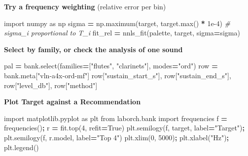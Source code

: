 \documentclass[
  10pt,
]{article}
\newenvironment{Shaded}{\begin{snugshade}}{\end{snugshade}}
\newcommand{\BuiltInTok}[1]{#1}
\newcommand{\CommentTok}[1]{\textcolor[rgb]{0.56,0.35,0.01}{\textit{#1}}}
\newcommand{\DecValTok}[1]{\textcolor[rgb]{0.00,0.00,0.81}{#1}}
\newcommand{\FloatTok}[1]{\textcolor[rgb]{0.00,0.00,0.81}{#1}}
\newcommand{\ImportTok}[1]{#1}
\newcommand{\NormalTok}[1]{#1}
\newcommand{\OperatorTok}[1]{\textcolor[rgb]{0.81,0.36,0.00}{\textbf{#1}}}
\newcommand{\StringTok}[1]{\textcolor[rgb]{0.31,0.60,0.02}{#1}}
\newcommand{\VariableTok}[1]{\textcolor[rgb]{0.00,0.00,0.00}{#1}}
\begin{document}
\textbf{Try a frequency weighting} (relative error per bin)

\begin{Shaded}
\begin{Highlighting}[]
\ImportTok{import}\NormalTok{ numpy }\ImportTok{as}\NormalTok{ np}
\NormalTok{sigma }\OperatorTok{=}\NormalTok{ np.maximum(target, target.}\BuiltInTok{max}\NormalTok{() }\OperatorTok{*} \FloatTok{1e{-}4}\NormalTok{)   }\CommentTok{\# sigma\_i proportional to T\_i}
\NormalTok{fit\_rel }\OperatorTok{=}\NormalTok{ nnls\_fit(palette, target, sigma}\OperatorTok{=}\NormalTok{sigma)}
\end{Highlighting}
\end{Shaded}

\textbf{Select by family, or check the analysis of one
sound}

\begin{Shaded}
\begin{Highlighting}[]
\NormalTok{pal }\OperatorTok{=}\NormalTok{ bank.select(families}\OperatorTok{=}\NormalTok{[}\StringTok{"flutes"}\NormalTok{, }\StringTok{"clarinets"}\NormalTok{], modes}\OperatorTok{=}\StringTok{"ord"}\NormalTok{)}
\NormalTok{row }\OperatorTok{=}\NormalTok{ bank.meta[}\StringTok{"vln{-}a4x{-}ord{-}mf"}\NormalTok{]}
\NormalTok{row[}\StringTok{"sustain\_start\_s"}\NormalTok{], row[}\StringTok{"sustain\_end\_s"}\NormalTok{], row[}\StringTok{"level\_db"}\NormalTok{], row[}\StringTok{"method"}\NormalTok{]}
\end{Highlighting}
\end{Shaded}

\textbf{Plot Target against a Recommendation}

\begin{Shaded}
\begin{Highlighting}[]
\ImportTok{import}\NormalTok{ matplotlib.pyplot }\ImportTok{as}\NormalTok{ plt}
\ImportTok{from}\NormalTok{ laborch.bank }\ImportTok{import}\NormalTok{ frequencies}
\NormalTok{f }\OperatorTok{=}\NormalTok{ frequencies()}\OperatorTok{;}\NormalTok{ r }\OperatorTok{=}\NormalTok{ fit.top(}\DecValTok{4}\NormalTok{, refit}\OperatorTok{=}\VariableTok{True}\NormalTok{)}
\NormalTok{plt.semilogy(f, target, label}\OperatorTok{=}\StringTok{"Target"}\NormalTok{)}\OperatorTok{;}\NormalTok{ plt.semilogy(f, r.model, label}\OperatorTok{=}\StringTok{"Top 4"}\NormalTok{)}
\NormalTok{plt.xlim(}\DecValTok{0}\NormalTok{, }\DecValTok{5000}\NormalTok{)}\OperatorTok{;}\NormalTok{ plt.xlabel(}\StringTok{"Hz"}\NormalTok{)}\OperatorTok{;}\NormalTok{ plt.legend()}
\end{Highlighting}
\end{Shaded}
\end{document}
